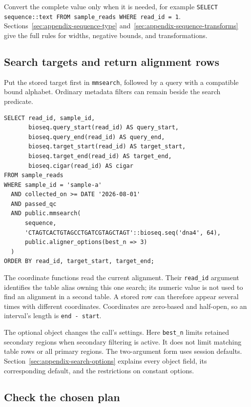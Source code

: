 Convert the complete value only when it is needed, for example
\texttt{SELECT sequence::text FROM sample\_reads WHERE read\_id = 1}.
Sections~\ref{sec:appendix-sequence-type}
and~\ref{sec:appendix-sequence-transforms} give the full rules for widths,
negative bounds, and transformations.

\subsection{Search targets and return alignment rows}

Put the stored target first in \texttt{mmsearch}, followed by a query with a
compatible bound alphabet. Ordinary metadata filters can remain beside the
search predicate.

\par\noindent\begin{minipage}{\linewidth}
\begin{lstlisting}[style=bioseq-appendix-sql]
SELECT read_id, sample_id,
       bioseq.query_start(read_id) AS query_start,
       bioseq.query_end(read_id) AS query_end,
       bioseq.target_start(read_id) AS target_start,
       bioseq.target_end(read_id) AS target_end,
       bioseq.cigar(read_id) AS cigar
FROM sample_reads
WHERE sample_id = 'sample-a'
  AND collected_on >= DATE '2026-08-01'
  AND passed_qc
  AND public.mmsearch(
      sequence,
      'CTAGTCACTGTAGCCTGATCGTAGCTAGT'::bioseq.seq('dna4', 64),
      public.aligner_options(best_n => 3)
  )
ORDER BY read_id, target_start, target_end;
\end{lstlisting}
\end{minipage}

The coordinate functions read the current alignment. Their \texttt{read\_id}
argument identifies the table alias owning this one search; its numeric value
is not used to find an alignment in a second table. A stored row can therefore
appear several times with different coordinates. Coordinates are zero-based
and half-open, so an interval's length is \texttt{end - start}.

The optional object changes the call's settings. Here \texttt{best\_n}
limits retained secondary regions when secondary filtering is active. It
does not limit matching table rows or all primary regions. The two-argument
form uses session defaults. Section~\ref{sec:appendix-search-options}
explains every object field, its corresponding default, and the restrictions
on constant options.

\subsection{Check the chosen plan}

